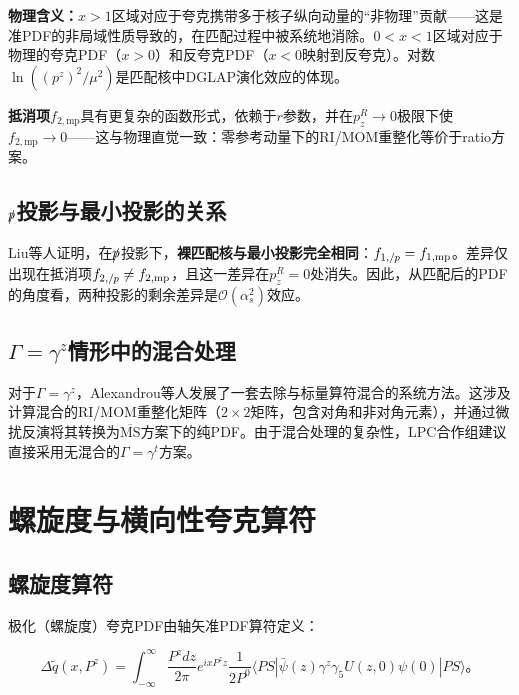 \documentclass[12pt,a4paper]{ctexart}
\theoremstyle{definition}
\begin{document}
\textbf{物理含义：}$x > 1$区域对应于夸克携带多于核子纵向动量的``非物理''贡献——这是准PDF的非局域性质导致的，在匹配过程中被系统地消除。$0 < x < 1$区域对应于物理的夸克PDF（$x > 0$）和反夸克PDF（$x < 0$映射到反夸克）。对数$\ln((p^z)^2/\mu^2)$是匹配核中DGLAP演化效应的体现。

\textbf{抵消项}$f_{2,\text{mp}}$具有更复杂的函数形式\cite{Liu2019isovector}，依赖于$r$参数，并在$p^R_z \to 0$极限下使$f_{2,\text{mp}} \to 0$——这与物理直觉一致：零参考动量下的RI/MOM重整化等价于ratio方案。

\subsection{$\slashed{p}$投影与最小投影的关系}

Liu等人\cite{Liu2019isovector}证明，在$\slashed{p}$投影下，\textbf{裸匹配核与最小投影完全相同}：$f_{1,/\mskip-1mu p} = f_{1,\text{mp}}$。差异仅出现在抵消项$f_{2,/\mskip-1mu p} \neq f_{2,\text{mp}}$，且这一差异在$p^R_z = 0$处消失。因此，从匹配后的PDF的角度看，两种投影的剩余差异是$\mathcal{O}(\alpha^2_s)$效应。

\subsection{$\Gamma = \gamma^z$情形中的混合处理}

对于$\Gamma = \gamma^z$，Alexandrou等人\cite{Alexandrou2017}发展了一套去除与标量算符混合的系统方法。这涉及计算混合的RI/MOM重整化矩阵（$2\times2$矩阵，包含对角和非对角元素），并通过微扰反演将其转换为$\overline{\text{MS}}$方案下的纯PDF。由于混合处理的复杂性，LPC合作组建议\cite{Liu2019isovector}直接采用无混合的$\Gamma = \gamma^t$方案。

\section{螺旋度与横向性夸克算符}

\subsection{螺旋度算符}

极化（螺旋度）夸克PDF由轴矢准PDF算符定义\cite{LP3helicity,Alexandrou2017}：

\begin{equation}
\Delta \tilde{q}(x, P^z) = \int_{-\infty}^{\infty} \frac{P^z dz}{2\pi} e^{ixP^z z} \frac{1}{2P^0} \langle PS| \bar{\psi}(z) \gamma^z \gamma_5 U(z,0) \psi(0) |PS\rangle。
\label{eq:helicity_quasi}
\end{equation}
\end{document}
